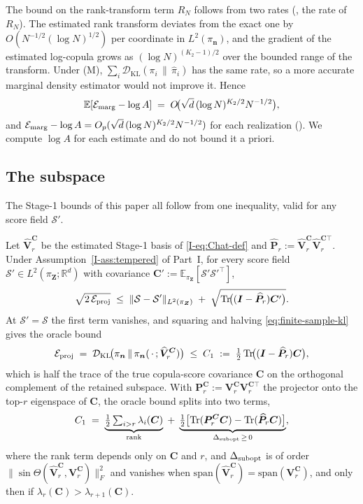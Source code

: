 \documentclass[review,hidelinks,onefignum,onetabnum]{siamart251216}
\newcommand{\RR}{\mathbb{R}}
\newcommand{\EE}{\mathbb{E}}
\newcommand{\DKL}{\mathcal{D}_{\mathrm{KL}}}
\newcommand{\tr}{\operatorname{Tr}}
\newcommand{\mC}{\bm{C}}
\newcommand{\mV}{\bm{V}}
\newcommand{\hmV}{\widehat{\bm{V}}}
\newcommand{\mP}{\bm{P}}
\newcommand{\hmP}{\widehat{\bm{P}}}
\newcommand{\mI}{\bm{I}}
\newcommand{\vn}{\bm{n}}
\newcommand{\vZ}{\bm{Z}}
\newcommand{\scS}{\mathcal{S}}
\begin{document}
The bound on the rank-transform term $R_N$ follows from two rates (, the rate of $R_N$). The estimated rank transform deviates from the exact one by $O(N^{-1/2}(\log N)^{1/2})$ per coordinate in $L^2(\pi_{\vn})$, and the gradient of the estimated log-copula grows as $(\log N)^{(K_2-1)/2}$ over the bounded range of the transform. Under \textup{(M)}, $\sum_i\DKL(\pi_i\,\|\,\widehat\pi_i)$ has the same rate, so a more accurate marginal density estimator would not improve it. Hence
\begin{equation}
  \EE[\mathcal E_{\rm marg} - \log A] \;=\; O\!\bigl(\sqrt d\,(\log N)^{K_2/2}N^{-1/2}\bigr),
  \label{eq:Delta-marg}
\end{equation}
and $\mathcal E_{\rm marg} - \log A = O_p(\sqrt d\,(\log N)^{K_2/2}N^{-1/2})$ for each realization (). We compute $\log A$ for each estimate and do not bound it a priori.

\subsection{The subspace}
\label{sec:stage1-error}


The Stage-1 bounds of this paper all follow from one inequality, valid for any score field $\scS'$.

\begin{proposition}
\label{prop:stage1-cert}
Let $\hmV_r^{\mC}$ be the estimated Stage-1 basis of \eqref{I-eq:Chat-def} and $\hmP_r := \hmV_r^{\mC}\hmV_r^{\mC\top}$. Under Assumption~\ref{I-ass:tempered} of Part~I, for every score field $\scS' \in L^2(\pi_{\vZ};\RR^d)$ with covariance $\mC' := \EE_{\pi_{\vZ}}[\scS'\scS'^{\top}]$,
\begin{equation}
  \sqrt{2\,\mathcal E_{\rm proj}}
  \;\le\;
  \|\scS - \scS'\|_{L^2(\pi_{\vZ})} \;+\; \sqrt{\tr\!\bigl((\mI-\hmP_r)\mC'\bigr)}.
  \label{eq:finite-sample-kl}
\end{equation}
At $\scS' = \scS$ the first term vanishes, and squaring and halving \eqref{eq:finite-sample-kl} gives the oracle bound
\begin{equation}
  \mathcal E_{\rm proj} \;=\; \DKL\!\bigl(\pi_{\vn}\,\|\,\pi_{\vn}(\,\cdot\,;\hmV_r^{\mC})\bigr)
  \;\le\;
  C_1 \;:=\; \tfrac12\tr\!\bigl((\mI-\hmP_r)\mC\bigr),
  \label{eq:stage1-cert}
\end{equation}
which is half the trace of the true copula-score covariance $\mC$ on the orthogonal complement of the retained subspace. With $\mP_r^{\mC} := \mV_r^{\mC}\mV_r^{\mC\top}$ the projector onto the top-$r$ eigenspace of $\mC$, the oracle bound splits into two terms,
\begin{equation}
  C_1 \;=\; \underbrace{\tfrac12\textstyle\sum_{i>r}\lambda_i(\mC)}_{\text{rank}} \;+\; \underbrace{\tfrac12\bigl[\tr(\mP_r^{\mC}\mC) - \tr(\hmP_r\mC)\bigr]}_{\Delta_{\rm subopt}\,\ge\,0},
  \label{eq:stage1-split}
\end{equation}
where the rank term depends only on $\mC$ and $r$, and $\Delta_{\rm subopt}$ is of order $\|\sin\Theta(\hmV_r^{\mC},\mV_r^{\mC})\|_F^2$ and vanishes when $\mathrm{span}(\hmV_r^{\mC}) = \mathrm{span}(\mV_r^{\mC})$, and only then if $\lambda_r(\mC) > \lambda_{r+1}(\mC)$.
\end{proposition}
\end{document}

